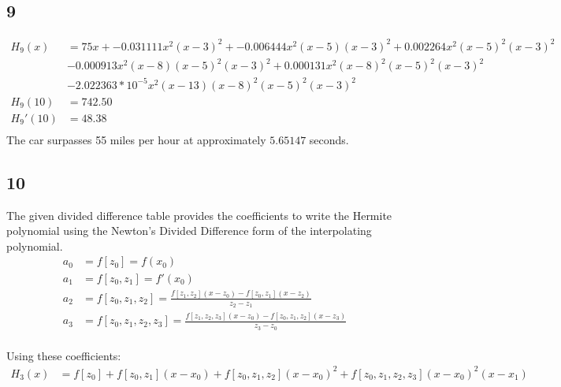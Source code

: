 \documentclass{oisinclass}
\begin{document}
\subsection*{9}
\begin{align*}
	H_9(x)   & = 75x+-0.031111x^{2} \left(x - 3\right)^{2}+-0.006444x^{2} \left(x - 5\right) \left(x - 3\right)^{2}+0.002264x^{2} \left(x - 5\right)^{2} \left(x - 3\right)^{2}   \\
	         & -0.000913x^{2} \left(x - 8\right) \left(x - 5\right)^{2} \left(x - 3\right)^{2}+0.000131x^{2} \left(x - 8\right)^{2} \left(x - 5\right)^{2} \left(x - 3\right)^{2} \\
	         & -2.022363*10^{-5}x^{2} \left(x - 13\right) \left(x - 8\right)^{2} \left(x - 5\right)^{2} \left(x - 3\right)^{2}                                                    \\
	H_9(10)  & = 742.50                                                                                                                                                           \\
	H_9'(10) & = 48.38                                                                                                                                                            \\
\end{align*}
The car surpasses 55 miles per hour at approximately \(5.65147\) seconds.
\subsection*{10}

The given divided difference table provides the coefficients to write the Hermite polynomial using the Newton's Divided Difference form of the interpolating polynomial.
\begin{align*}
	a_0 & = f[z_0] = f(x_0)                                                                                   \\
	a_1 & = f[z_0, z_1] = f'(x_0)                                                                             \\
	a_2 & = f[z_0, z_1, z_2] = \frac{f[z_1, z_2] (x - z_0) - f[z_0, z_1] (x - z_2)}{z_2 - z_1}                \\
	a_3 & = f[z_0, z_1, z_2, z_3] = \frac{f[z_1, z_2, z_3] (x - z_0) - f[z_0, z_1, z_2] (x - z_3)}{z_3 - z_0} \\
\end{align*}

Using these coefficients:
\begin{align*}
	H_3(x) & = f[z_0] + f[z_0, z_1] (x-x_0) + f[z_0, z_1, z_2] (x-x_0)^2 + f[z_0, z_1, z_2, z_3](x-x_0)^2(x-x_1) \\
\end{align*}
\end{document}

